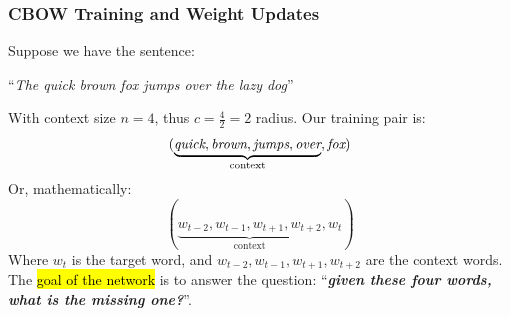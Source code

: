 \subsubsection{CBOW Training and Weight Updates}\label{sec:cbow-training-and-weight-updates}

Suppose we have the sentence:
\begin{center}
    ``\emph{The quick brown fox jumps over the lazy dog}''
\end{center}
With context size $n = 4$, thus $c = \frac{4}{2} = 2$ radius. Our training pair is:
\begin{equation*}
    (\underbrace{\emph{quick}, \emph{brown}, \emph{jumps}, \emph{over}}_{\text{context}}, \emph{fox})
\end{equation*}
Or, mathematically:
\begin{equation*}
    (\underbrace{w_{t-2}, w_{t-1}, w_{t+1}, w_{t+2}}_{\text{context}}, w_t)
\end{equation*}
Where $w_t$ is the target word, and $w_{t-2}, w_{t-1}, w_{t+1}, w_{t+2}$ are the context words. The \hl{goal of the network} is to answer the question: ``\emph{\textbf{given these four words, what is the missing one?}}''.

